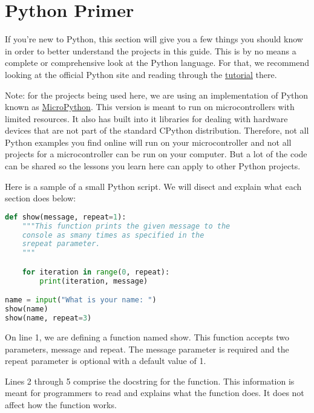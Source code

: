 \chapter{Python Primer}
If you're new to Python, this section will give you a few things you should know
in order to better understand the projects in this guide. This is by no means a
complete or comprehensive look at the Python language. For that, we recommend looking
at the official Python site and reading through the \href{https://docs.python.org/3/tutorial/}{tutorial}
there.
\linebreak

\begin{tcolorbox}
    Note: for the projects being used here, we are using an implementation of
    Python known as \href{https://micropython.org/}{MicroPython}. This version
    is meant to run on microcontrollers with limited resources. It
    also has built into it libraries for dealing with hardware devices that are
    not part of the standard CPython distribution. Therefore, not all Python examples
    you find online will run on your microcontroller and not all projects for a
    microcontroller can be run on your computer. But a lot of the code can be shared
    so the lessons you learn here can apply to other Python projects.
\end{tcolorbox}

Here is a sample of a small Python script. We will disect and explain what each
section does below:

\begin{lstlisting}[language=Python,caption=An example Python script]
def show(message, repeat=1):
    """This function prints the given message to the
    console as smany times as specified in the
    srepeat parameter.
    """

    for iteration in range(0, repeat):
        print(iteration, message)

name = input("What is your name: ")
show(name)
show(name, repeat=3)
\end{lstlisting}

On line 1, we are defining a function named show. This function accepts two parameters,
message and repeat. The message parameter is required and the repeat parameter
is optional with a default value of 1.

Lines 2 through 5 comprise the docstring for the function. This information is meant
for programmers to read and explains what the function does. It does not affect how
the function works.

